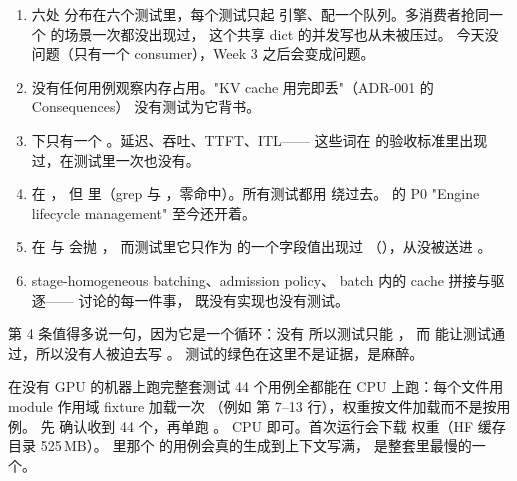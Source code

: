 \begin{enumerate}[label=\arabic*.]
  \item {}六处  分布在六个测试里，每个测试只起
        引擎、配一个队列。多消费者抢同一个  的场景一次都没出现过，
         这个共享 dict 的并发写也从未被压过。
        今天没问题（只有一个 consumer），Week 3 之后会变成问题。
  \item {}没有任何用例观察内存占用。"KV cache 用完即丢"（ADR-001 的 Consequences）
        没有测试为它背书。
  \item {} 下只有一个 。延迟、吞吐、TTFT、ITL——
        这些词在  的验收标准里出现过，在测试里一次也没有。
  \item {} 在
        ，
        但  里（grep  与
        ，零命中）。所有测试都用  绕过去。
         的 P0 "Engine lifecycle management" 至今还开着。
  \item {} 在
         与
         会抛 ，
        而测试里它只作为  的一个字段值出现过
        （），从没被送进 。
  \item {}stage-homogeneous batching、admission policy、
        batch 内的 cache 拼接与驱逐—— 讨论的每一件事，
        既没有实现也没有测试。
\end{enumerate}

第 4 条值得多说一句，因为它是一个循环：没有  所以测试只能 ，
而  能让测试通过，所以没有人被迫去写 。
测试的绿色在这里不是证据，是麻醉。

\begin{tipbox}{在没有 GPU 的机器上跑完整套测试}
44 个用例全都能在 CPU 上跑：每个文件用 module 作用域 fixture 加载一次 
（例如  第 7--13 行），权重按文件加载而不是按用例。
先  确认收到 44 个，再单跑
。
\resources CPU 即可。首次运行会下载  权重（HF 缓存目录 525\,MB）。
 里那个  的用例会真的生成到上下文写满，
是整套里最慢的一个。
\end{tipbox}
